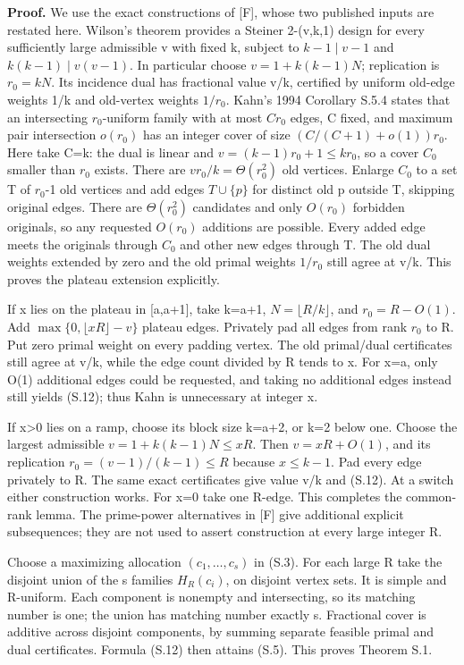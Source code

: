\documentclass[
  11pt,
]{article}
\begin{document}
\textbf{Proof.} We use the exact constructions of {[}F{]}, whose two
published inputs are restated here. Wilson's theorem provides a Steiner
2-(v,k,1) design for every sufficiently large admissible v with fixed k,
subject to \(k-1\mid v-1\) and \(k(k-1)\mid v(v-1)\). In particular
choose \(v=1+k(k-1)N\); replication is \(r_0=kN\). Its incidence dual
has fractional value v/k, certified by uniform old-edge weights 1/k and
old-vertex weights \(1/r_0\). Kahn's 1994 Corollary S.5.4 states that an
intersecting \(r_0\)-uniform family with at most \(Cr_0\) edges, C
fixed, and maximum pair intersection \(o(r_0)\) has an integer cover of
size \((C/(C+1)+o(1))r_0\). Here take C=k: the dual is linear and
\(v=(k-1)r_0+1\le kr_0\), so a cover \(C_0\) smaller than \(r_0\)
exists. There are \(vr_0/k=\Theta(r_0^2)\) old vertices. Enlarge \(C_0\)
to a set T of \(r_0\)-1 old vertices and add edges \(T\cup\{p\}\) for
distinct old p outside T, skipping original edges. There are
\(\Theta(r_0^2)\) candidates and only \(O(r_0)\) forbidden originals, so
any requested \(O(r_0)\) additions are possible. Every added edge meets
the originals through \(C_0\) and other new edges through T. The old
dual weights extended by zero and the old primal weights \(1/r_0\) still
agree at v/k. This proves the plateau extension explicitly.

If x lies on the plateau in {[}a,a+1{]}, take k=a+1,
\(N=\lfloor R/k\rfloor\), and \(r_0=R-O(1)\). Add
\(\max\{0,\lfloor xR\rfloor-v\}\) plateau edges. Privately pad all edges
from rank \(r_0\) to R. Put zero primal weight on every padding vertex.
The old primal/dual certificates still agree at v/k, while the edge
count divided by R tends to x. For x=a, only O(1) additional edges could
be requested, and taking no additional edges instead still yields
(S.12); thus Kahn is unnecessary at integer x.

If x\textgreater0 lies on a ramp, choose its block size k=a+2, or k=2
below one. Choose the largest admissible \(v=1+k(k-1)N\le xR\). Then
\(v=xR+O(1)\), and its replication \(r_0=(v-1)/(k-1)\le R\) because
\(x\le k-1\). Pad every edge privately to R. The same exact certificates
give value v/k and (S.12). At a switch either construction works. For
x=0 take one R-edge. This completes the common-rank lemma. The
prime-power alternatives in {[}F{]} give additional explicit
subsequences; they are not used to assert construction at every large
integer R.

Choose a maximizing allocation \((c_1,\ldots,c_s)\) in (S.3). For each
large R take the disjoint union of the s families \(H_R(c_i)\), on
disjoint vertex sets. It is simple and R-uniform. Each component is
nonempty and intersecting, so its matching number is one; the union has
matching number exactly s. Fractional cover is additive across disjoint
components, by summing separate feasible primal and dual certificates.
Formula (S.12) then attains (S.5). This proves Theorem S.1.
\end{document}
